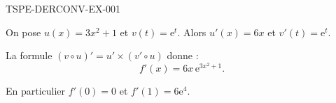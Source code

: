 \begin{corrige}{TSPE-DERCONV-EX-001}


On pose $u(x) = 3x^2 + 1$ et $v(t) = \mathrm{e}^t$. Alors $u'(x) = 6x$ et $v'(t) = \mathrm{e}^t$.

La formule $(v \circ u)' = u' \times (v' \circ u)$ donne :
\[ f'(x) = 6x\, \mathrm{e}^{3x^2 + 1}. \]

En particulier $f'(0) = 0$ et $f'(1) = 6\mathrm{e}^4$.

\end{corrige}
